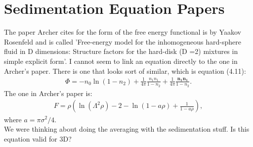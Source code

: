 \documentclass[11pt, a4paper]{article}
\theoremstyle{definition}
\begin{document}
	\section{Sedimentation Equation Papers}
	The paper Archer cites for the form of the free energy functional is by Yaakov Rosenfeld and is called 'Free-energy model for the inhomogeneous hard-sphere fluid in D dimensions:
	Structure factors for the hard-disk (D =2) mixtures in simple explicit form'.
	I cannot seem to link an equation directly to the one in Archer's paper. There is one that looks sort of similar, which is equation (4.11):
	\begin{align*}
		\Phi = - n_0 \ln (1-n_2) + \frac{1}{4 \pi} \frac{n_1 n_1}{1-n_2} +  \frac{1}{4 \pi} \frac{\mathbf{n_1 n_1}}{1-n_2}.
	\end{align*}
	The one in Archer's paper is:
	\begin{align*}
		F = \rho \left(\ln(\Lambda^2 \rho) -2 -\ln(1-a\rho) + \frac{1}{1-a\rho}\right), 
	\end{align*}
	where $a = \pi \sigma^2 /4$.
	\\
	We were thinking about doing the averaging with the sedimentation stuff. Is this equation valid for 3D?
	
\end{document}

